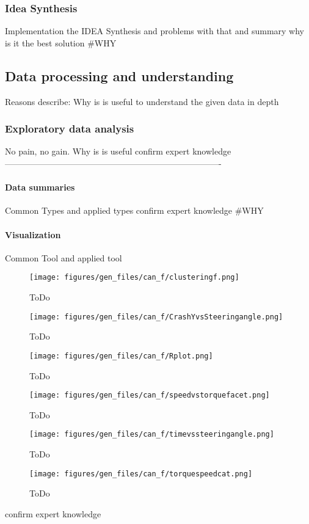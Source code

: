 		\subsubsection{Idea Synthesis}
		Implementation the IDEA Synthesis and problems with that and summary why is it the best solution
		\#WHY
\subsection{Data processing and understanding}
		Reasons describe: Why is is useful to understand the given data in depth
	\subsubsection{Exploratory data analysis}
		No pain, no gain. Why is is useful
		confirm expert knowledge
%
----------------------------------------------------------------------------
		\paragraph{Data summaries}
		Common Types and applied types
		confirm expert knowledge
		\#WHY
		\paragraph{Visualization}
		Common Tool and applied tool
		\begin{figure}[!ht]
			\centering
			\texttt{[image: figures/gen\_files/can\_f/clusteringf.png]}
			\caption{ToDo} 
			\end{figure}
		\begin{figure}[!ht]
			\centering
			\texttt{[image: figures/gen\_files/can\_f/CrashYvsSteeringangle.png]}
			\caption{ToDo} 
			\end{figure}
		\begin{figure}[!ht]
			\centering
			\texttt{[image: figures/gen\_files/can\_f/Rplot.png]}
			\caption{ToDo} 
			\end{figure}		
		\begin{figure}[!ht]
			\centering
			\texttt{[image: figures/gen\_files/can\_f/speedvstorquefacet.png]}
			\caption{ToDo} 
			\end{figure}	
		\begin{figure}[!ht]
			\centering
			\texttt{[image: figures/gen\_files/can\_f/timevssteeringangle.png]}
			\caption{ToDo} 
			\end{figure}	
		\begin{figure}[!ht]
			\centering
			\texttt{[image: figures/gen\_files/can\_f/torquespeedcat.png]}
			\caption{ToDo} 
			\end{figure}		
		confirm expert knowledge
